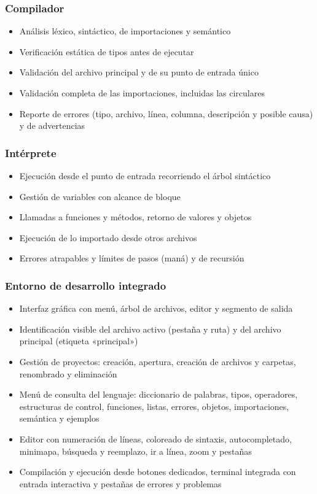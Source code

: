 \subsubsection*{Compilador}
\begin{itemize}
  \item Análisis léxico, sintáctico, de importaciones y semántico
  \item Verificación estática de tipos antes de ejecutar
  \item Validación del archivo principal y de su punto de entrada único
  \item Validación completa de las importaciones, incluidas las circulares
  \item Reporte de errores (tipo, archivo, línea, columna, descripción y posible causa) y de advertencias
\end{itemize}

\subsubsection*{Intérprete}
\begin{itemize}
  \item Ejecución desde el punto de entrada recorriendo el árbol sintáctico
  \item Gestión de variables con alcance de bloque
  \item Llamadas a funciones y métodos, retorno de valores y objetos
  \item Ejecución de lo importado desde otros archivos
  \item Errores atrapables y límites de pasos (maná) y de recursión
\end{itemize}

\subsubsection*{Entorno de desarrollo integrado}
\begin{itemize}
  \item Interfaz gráfica con menú, árbol de archivos, editor y segmento de salida
  \item Identificación visible del archivo activo (pestaña y ruta) y del archivo principal (etiqueta «principal»)
  \item Gestión de proyectos: creación, apertura, creación de archivos y carpetas, renombrado y eliminación
  \item Menú de consulta del lenguaje: diccionario de palabras, tipos, operadores, estructuras de control, funciones, listas, errores, objetos, importaciones, semántica y ejemplos
  \item Editor con numeración de líneas, coloreado de sintaxis, autocompletado, minimapa, búsqueda y reemplazo, ir a línea, zoom y pestañas
  \item Compilación y ejecución desde botones dedicados, terminal integrada con entrada interactiva y pestañas de errores y problemas
\end{itemize}

